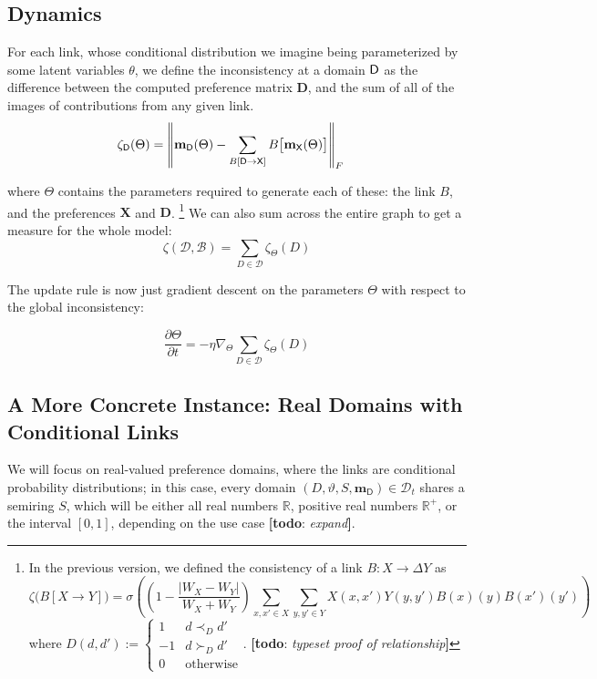 \documentclass{article}
\theoremstyle{plain}
\theoremstyle{definition}
\theoremstyle{remark}
\newcommand{\todo}[1]{{\color{red}\large\textbf{[todo}: {\normalsize\itshape#1}\textbf{]}}}
\newcommand\mat[1]{\mathbf #1}
\newcommand\m[1]{\mathbf m_{\mathsf #1}}
\begin{document}
 	
 	
 	\subsection{Dynamics} \label{sec:formal-dynamics}
	
	
	
	For each link, whose conditional distribution we imagine being parameterized by some latent variables $\theta$, we define the inconsistency at a domain $\sf D$ as the difference between the computed preference matrix $\mat D$, and the sum of all of the images of contributions from any given link.
	\begin{align*}
		\zeta_{\mathsf D}(\Theta) &= \left\lVert \m D(\Theta)  - \sum_{B[\sf D \to X]} B\big[\m X(\Theta) \big] \right\rVert_F
	\end{align*}

	where $\Theta$ contains the parameters required to generate each of these: the link $B$, and the preferences $\mat X$ and $\mat D$.
 	\footnote{In the previous version, we defined the consistency of a link $B : X \to \Delta Y$ as 
 	 	\[ \zeta\big(B[X \to Y]\big) =  \sigma \left( \left(1- \frac{|W_X - W_Y|}{W_X + W_Y}\right) \sum_{x,x' \in X}\sum_{y,y' \in Y} X(x,x') Y(y,y') B(x)(y) B(x')(y') \right) \]
 		where 
 	 	$ D(d, d') := \begin{cases}
 	 		1 & d \prec_D d' \\
 	 		-1 & d \succ_D d' \\
 	 		0 & \text{otherwise}
 	 	\end{cases} $.  \todo{typeset proof of relationship}}	
 	We can also sum across the entire graph to get a measure for the whole model:
 	\[ \zeta(\mathcal D, \mathcal B) = \sum_{D \in \mathcal D} \zeta_\Theta(D) \]
 	
 	The update rule is now just gradient descent on the parameters $\Theta$ with respect to the global inconsistency:
 	
 	\[ \frac{\partial \Theta}{\partial t} = - \eta \nabla_\Theta \sum_{D \in \mathcal D} \zeta_\Theta(D) \]
 	
 	

 	
 	\subsection{A More Concrete Instance: Real Domains with Conditional Links}
 	We will focus on real-valued preference domains, where the links are conditional probability distributions; in this case, every domain $(D, \vartheta, S, \m D) \in \mathcal D_t$ shares a semiring $S$, which will be either all real numbers $\mathbb R$, positive real numbers $\mathbb R^+$, or the interval $[0,1]$, depending on the use case \todo{expand}.
 	
\end{document}
